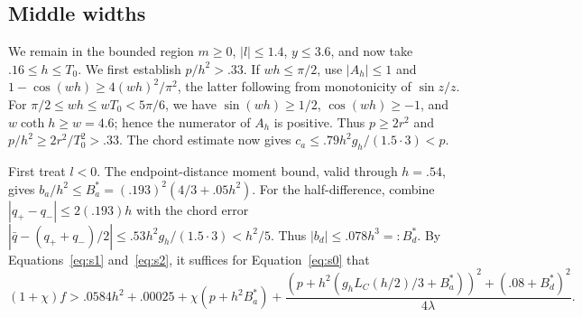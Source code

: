 \subsection{Middle widths}\label{subsec:segments-middle}

We remain in the bounded region \(m\ge0\), \(|l|\le1.4\),
\(y\le3.6\), and now take \(.16\le h\le T_0\).
We first establish $p/h^2>.33$.
If $wh\le\pi/2$, use $|A_h|\le1$ and
$1-\cos(wh)\ge4(wh)^2/\pi^2$, the latter following from
monotonicity of $\sin z/z$.
For $\pi/2\le wh\le wT_0<5\pi/6$, we have
$\sin(wh)\ge1/2$, $\cos(wh)\ge-1$, and $w\coth h\ge w=4.6$;
hence the numerator of $A_h$ is positive. Thus
$p\ge2r^2$ and $p/h^2\ge2r^2/T_0^2>.33$.
The chord estimate now gives
$c_a\le.79h^2g_h/(1.5\cdot3)<p$.

First treat $l<0$. The endpoint-distance moment bound, valid through
$h=.54$, gives $b_a/h^2\le B_a^*=(.193)^2(4/3+.05h^2)$.
For the half-difference, combine $|q_+-q_-|\le2(.193)h$ with
the chord error
$|\bar q-(q_++q_-)/2|\le.53h^2g_h/(1.5\cdot3)<h^2/5$.
Thus $|b_d|\le.078h^3=:B_d^*$.
By Equations~\eqref{eq:s1} and~\eqref{eq:s2}, it suffices for Equation~\eqref{eq:s0} that
\[
 (1+\chi)f>
 .0584 h^2+.00025+\chi(p+h^2 B_a^*)+
 \frac{(p+h^2(g_h L_C(h/2)/3+B_a^*))^2+(.08+B_d^*)^2}{4\lambda}.                  \tag{s4}\label{eq:s4}
\]

